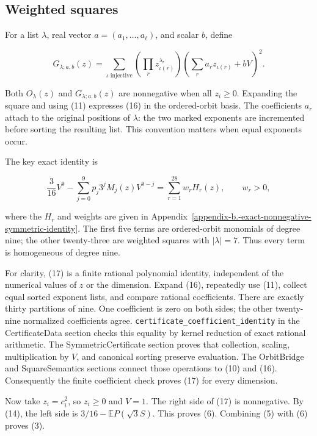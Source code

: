 \documentclass[11pt]{article}
\begin{document}
\subsection{Weighted squares}\label{weighted-squares}

For a list \(\lambda\), real vector \(a=(a_1,\ldots,a_\ell)\), and
scalar \(b\), define

\[G_{\lambda;a,b}(z)=\sum_{\iota\text{ injective}}
 \left(\prod_rz_{\iota(r)}^{\lambda_r}\right)
 \left(\sum_ra_rz_{\iota(r)}+bV\right)^2. \tag{16}\]

Both \(O_\lambda(z)\) and \(G_{\lambda;a,b}(z)\) are nonnegative when
all \(z_i\ge0\). Expanding the square and using (11) expresses (16) in
the ordered-orbit basis. The coefficients \(a_r\) attach to the original
positions of \(\lambda\): the two marked exponents are incremented
before sorting the resulting list. This convention matters when equal
exponents occur.

The key exact identity is

\[\frac3{16}V^9-\sum_{j=0}^9p_j3^jM_j(z)V^{9-j}
   =\sum_{r=1}^{28}w_rH_r(z), \qquad w_r>0, \tag{17}\]

where the \(H_r\) and weights are given in
Appendix~\ref{appendix-b.-exact-nonnegative-symmetric-identity}. The first five
terms are ordered-orbit monomials of degree nine; the other twenty-three
are weighted squares with \(|\lambda|=7\). Thus every term is
homogeneous of degree nine.

For clarity, (17) is a finite rational polynomial identity, independent
of the numerical values of \(z\) or the dimension. Expand (16),
repeatedly use (11), collect equal sorted exponent lists, and compare
rational coefficients. There are exactly thirty partitions of nine. One
coefficient is zero on both sides; the other twenty-nine normalized
coefficients agree. \texttt{certificate\_coefficient\_identity} in the
CertificateData section checks this equality by kernel reduction of
exact rational arithmetic. The SymmetricCertificate section proves that
collection, scaling, multiplication by \(V\), and canonical sorting
preserve evaluation. The OrbitBridge and SquareSemantics sections
connect those operations to (10) and (16). Consequently the finite
coefficient check proves (17) for every dimension.

Now take \(z_i=c_i^2\), so \(z_i\ge0\) and \(V=1\). The right side of
(17) is nonnegative. By (14), the left side is
\(3/16-\mathbb EP(\sqrt3S)\). This proves (6). Combining (5) with (6)
proves (3).
\end{document}
